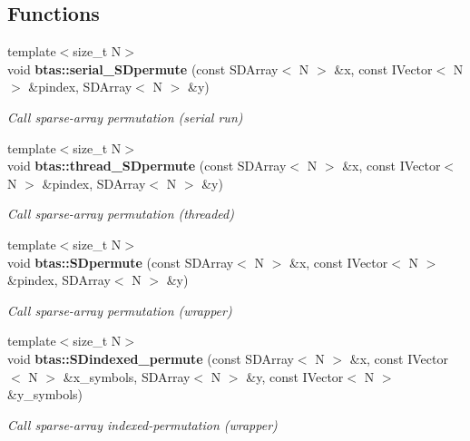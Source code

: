 \subsection*{Functions}
\begin{DoxyCompactItemize}
\item 
{\footnotesize template$<$size\-\_\-t N$>$ }\\void {\bf btas\-::serial\-\_\-\-S\-Dpermute} (const S\-D\-Array$<$ N $>$ \&x, const I\-Vector$<$ N $>$ \&pindex, S\-D\-Array$<$ N $>$ \&y)
\begin{DoxyCompactList}\small\item\em Call sparse-\/array permutation (serial run) \end{DoxyCompactList}\item 
{\footnotesize template$<$size\-\_\-t N$>$ }\\void {\bf btas\-::thread\-\_\-\-S\-Dpermute} (const S\-D\-Array$<$ N $>$ \&x, const I\-Vector$<$ N $>$ \&pindex, S\-D\-Array$<$ N $>$ \&y)
\begin{DoxyCompactList}\small\item\em Call sparse-\/array permutation (threaded) \end{DoxyCompactList}\item 
{\footnotesize template$<$size\-\_\-t N$>$ }\\void {\bf btas\-::\-S\-Dpermute} (const S\-D\-Array$<$ N $>$ \&x, const I\-Vector$<$ N $>$ \&pindex, S\-D\-Array$<$ N $>$ \&y)
\begin{DoxyCompactList}\small\item\em Call sparse-\/array permutation (wrapper) \end{DoxyCompactList}\item 
{\footnotesize template$<$size\-\_\-t N$>$ }\\void {\bf btas\-::\-S\-Dindexed\-\_\-permute} (const S\-D\-Array$<$ N $>$ \&x, const I\-Vector$<$ N $>$ \&x\-\_\-symbols, S\-D\-Array$<$ N $>$ \&y, const I\-Vector$<$ N $>$ \&y\-\_\-symbols)
\begin{DoxyCompactList}\small\item\em Call sparse-\/array indexed-\/permutation (wrapper) \end{DoxyCompactList}\end{DoxyCompactItemize}

